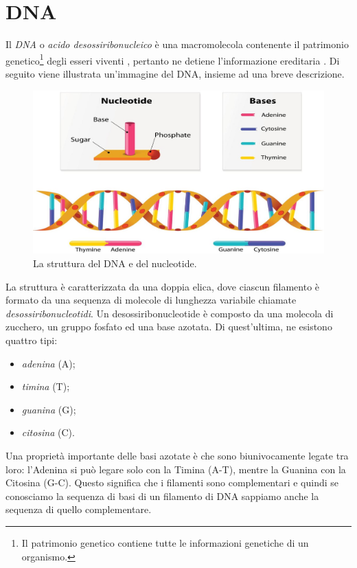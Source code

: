 \section{DNA}
Il \textit{DNA} o \textit{acido desossiribonucleico} è una macromolecola contenente il patrimonio genetico\footnote{Il patrimonio genetico contiene tutte le informazioni genetiche di un organismo.} degli esseri viventi \cite{campbellBiology}, pertanto ne detiene l'informazione ereditaria \cite{BiologySolomon}.
\newline
Di seguito viene illustrata un'immagine del DNA, insieme ad una breve descrizione.
\newline
\begin{figure}[h!]
	\includegraphics[width=\linewidth]{DNAStructure.jpg}
 	\caption{La struttura del DNA e del nucleotide.}
  	\label{fig:DnaAndNucleotideStructure}
\end{figure}
\newline
La struttura è caratterizzata da una doppia elica, dove ciascun filamento è formato da una sequenza di molecole di lunghezza variabile chiamate \textit{desossiribonucleotidi}.
\newline
Un desossiribonucleotide è composto da una molecola di zucchero, un gruppo fosfato ed una base azotata. Di quest'ultima, ne esistono quattro tipi:
\begin{itemize}
	\item \textit{adenina} (A);
	\item \textit{timina} (T);
	\item \textit{guanina} (G);
	\item \textit{citosina} (C).
\end{itemize}
Una proprietà importante delle basi azotate è che sono biunivocamente legate tra loro: l'Adenina si può legare solo con la Timina (A-T), mentre la Guanina con la Citosina (G-C). Questo significa che i filamenti sono complementari e quindi se conosciamo la sequenza di basi di un filamento di DNA sappiamo anche la sequenza di quello complementare.

